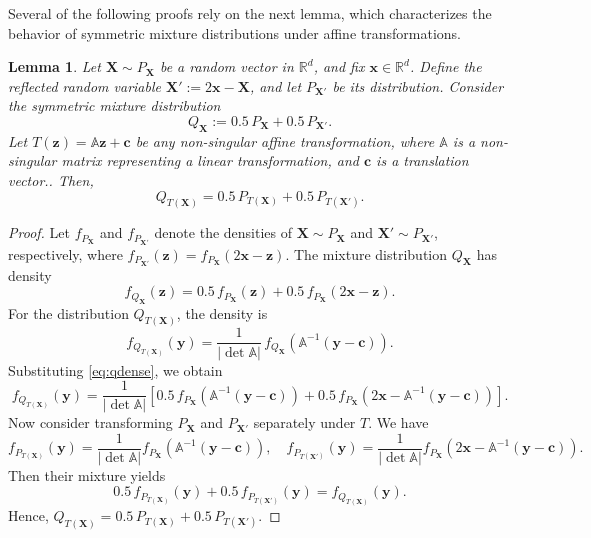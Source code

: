 \documentclass[final,3p,times]{elsarticle}
\newcommand{\vecx}{\mathbf{x}}
\newcommand{\vecX}{\mathbf{X}}
\newcommand{\vecz}{\mathbf{z}}
\newcommand{\vecy}{\mathbf{y}}
\newcommand{\vecc}{\mathbf{c}}
\newtheorem{lemma}{Lemma}
\begin{document}
Several of the following proofs rely on the next lemma, which characterizes the behavior of symmetric mixture distributions under affine transformations.
\begin{lemma}
\label{lem:affine_mixture}
Let $\vecX \sim P_{\vecX}$ be a random vector in $\mathbb{R}^d$, and fix $\vecx \in \mathbb{R}^d$. Define the reflected random variable $\vecX' := 2\vecx - \vecX$, and let $P_{\vecX'}$ be its distribution. Consider the symmetric mixture distribution
\[
Q_{\vecX} := 0.5\, P_{\vecX} + 0.5\, P_{\vecX'}.
\]
Let $T(\vecz) = \mathbb{A} \vecz + \vecc$ be any non-singular affine transformation, where $ \mathbb{A} $ is a non-singular matrix representing a linear transformation, and $ \vecc $ is a translation vector.. Then,
\[
Q_{T(\vecX)} = 0.5\, P_{T(\vecX)} + 0.5\, P_{T(\vecX')}.
\]
\end{lemma}
\begin{proof}
Let $f_{P_{\vecX}}$ and $f_{P_{\vecX'}}$ denote the densities of $\vecX \sim P_{\vecX}$ and $\vecX' \sim P_{\vecX'}$, respectively, where $f_{P_{\vecX'}}(\vecz) = f_{P_{\vecX}}(2\vecx - \vecz)$. The mixture distribution $Q_{\vecX}$ has density
\begin{equation}\label{eq:qdense}
f_{Q_{\vecX}}(\vecz) = 0.5\, f_{P_{\vecX}}(\vecz) + 0.5\, f_{P_{\vecX}}(2\vecx - \vecz).
\end{equation}
For the distribution $Q_{T(\vecX)}$, the density is
\[
f_{Q_{T(\vecX)}}(\vecy) = \frac{1}{|\det \mathbb{A}|}\, f_{Q_{\vecX}}(\mathbb{A}^{-1}(\vecy - \vecc)).
\]
Substituting \eqref{eq:qdense}, we obtain
\[
f_{Q_{T(\vecX)}}(\vecy) = \frac{1}{|\det \mathbb{A}|} \left[ 0.5\, f_{P_{\vecX}}(\mathbb{A}^{-1}(\vecy - \vecc)) + 0.5\, f_{P_{\vecX}}(2\vecx - \mathbb{A}^{-1}(\vecy - \vecc)) \right].
\]
Now consider transforming $ P_\vecX $ and $ P_{\vecX'} $ separately under $ T $. We have
\[
f_{P_{T(\vecX)}}(\vecy) = \frac{1}{|\det \mathbb{A}|} f_{P_{\vecX}}(\mathbb{A}^{-1}(\vecy - \vecc)), \quad
f_{P_{T(\vecX')}}(\vecy) = \frac{1}{|\det \mathbb{A}|} f_{P_{\vecX}}(2\vecx - \mathbb{A}^{-1}(\vecy - \vecc)).
\]
Then their mixture yields
\[
0.5\, f_{P_{T(\vecX)}}(\vecy) + 0.5\, f_{P_{T(\vecX')}}(\vecy) = f_{Q_{T(\vecX)}}(\vecy).
\]
Hence,
$
Q_{T(\vecX)} = 0.5\, P_{T(\vecX)} + 0.5\, P_{T(\vecX')}.
$
\end{proof}
\end{document}
